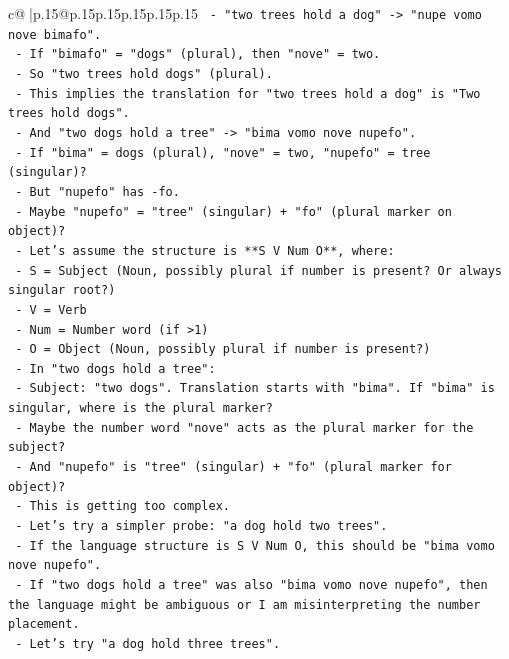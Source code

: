 \documentclass{article}
\begin{document}
{\begin{supertabular}{c@{$\;$}|p{.15\linewidth}@{}p{.15\linewidth}p{.15\linewidth}p{.15\linewidth}p{.15\linewidth}p{.15\linewidth}}
{{{\texttt{    {-} "two trees hold a dog" {-}> "nupe vomo nove bimafo".} \\
\texttt{    {-} If "bimafo" = "dogs" (plural), then "nove" = two.} \\
\texttt{    {-} So "two trees hold dogs" (plural).} \\
\texttt{    {-} This implies the translation for "two trees hold a dog" is "Two trees hold dogs".} \\
\texttt{    {-} And "two dogs hold a tree" {-}> "bima vomo nove nupefo".} \\
\texttt{    {-} If "bima" = dogs (plural), "nove" = two, "nupefo" = tree (singular)?} \\
\texttt{    {-} But "nupefo" has {-}fo.} \\
\texttt{    {-} Maybe "nupefo" = "tree" (singular) + "fo" (plural marker on object)?} \\
\texttt{    {-} Let's assume the structure is **S V Num O**, where:} \\
\texttt{      {-} S = Subject (Noun, possibly plural if number is present? Or always singular root?)} \\
\texttt{      {-} V = Verb} \\
\texttt{      {-} Num = Number word (if >1)} \\
\texttt{      {-} O = Object (Noun, possibly plural if number is present?)} \\
\texttt{    {-} In "two dogs hold a tree":} \\
\texttt{      {-} Subject: "two dogs". Translation starts with "bima". If "bima" is singular, where is the plural marker?} \\
\texttt{      {-} Maybe the number word "nove" acts as the plural marker for the subject?} \\
\texttt{      {-} And "nupefo" is "tree" (singular) + "fo" (plural marker for object)?} \\
\texttt{      {-} This is getting too complex.} \\
\texttt{    {-} Let's try a simpler probe: "a dog hold two trees".} \\
\texttt{      {-} If the language structure is S V Num O, this should be "bima vomo nove nupefo".} \\
\texttt{      {-} If "two dogs hold a tree" was also "bima vomo nove nupefo", then the language might be ambiguous or I am misinterpreting the number placement.} \\
\texttt{      {-} Let's try "a dog hold three trees".} \\
}}}
\end{supertabular}}
\end{document}
